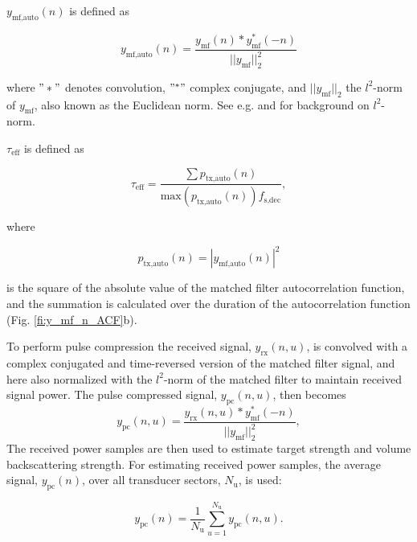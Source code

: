 \documentclass[preprint,12pt,TurnOnLineNumbers]{JASAnew}
\newcommand{\samplesymt}{n}
\newcommand{\channelsym}{u}
\newcommand{\nchannels}{N_{\textrm{u}}}
\newcommand{\fsdec}{f_{\textrm{s,dec}}}
\newcommand{\teff}{\tau_{\textrm{eff}}}
\newcommand{\yrx}{y_{\textrm{rx}}}
\newcommand{\ymf}{y_{\textrm{mf}}}
\newcommand{\ypc}{y_{\textrm{pc}}}
\newcommand{\ymfauto}{y_{\textrm{mf,auto}}}
\newcommand{\ptxauto}{p_{\textrm{tx,auto}}}
\begin{document}
$\ymfauto(\samplesymt)$ is defined as

\begin{equation}
\label{eq:TXAuto}
\ymfauto(\samplesymt) = \frac{\ymf(\samplesymt)*\ymf^*(-\samplesymt)}{||\ymf||^2_2}
\end{equation}

where $"*"$ denotes convolution, $"^*"$ complex conjugate, and $||\ymf||_2$ the $l^2$-norm of $\ymf$, also known as the Euclidean norm. See e.g. \citet{PadgettSigProc} and \citet{GhatakR} for background on $l^2$-norm.  

$\teff$ is defined as

\begin{equation}
\label{eq:TauEff}
\teff = \frac{\sum \ptxauto(\samplesymt)}{\textrm{max}(\ptxauto(\samplesymt))\fsdec},
\end{equation}

where

\begin{equation*}
\ptxauto(\samplesymt)  =  |\ymfauto(\samplesymt)|^2
\end{equation*}

is the square of the absolute value of the matched filter autocorrelation function, and the summation is calculated over the duration of the autocorrelation function (Fig. \ref{fi:y_mf_n_ACF}b).

To perform pulse compression the received signal, $\yrx(\samplesymt,\channelsym)$, is convolved with a complex conjugated and time-reversed version of the matched filter signal, and here also normalized with the $l^2$-norm of the matched filter to maintain received signal power. The pulse compressed signal, $\ypc(\samplesymt,\channelsym)$, then becomes
\begin{equation}
\label{eq:PulseComp}
\ypc(\samplesymt,\channelsym) = \frac{\yrx(\samplesymt,\channelsym)*\ymf^*(-\samplesymt)}{||\ymf||^2_2},
\end{equation}
%
The received power samples are then used to estimate target strength and volume backscattering strength. For estimating received power samples, the average signal, $\ypc(\samplesymt)$, over all transducer sectors, $\nchannels$, is used:

\begin{equation}
\label{eq:SumSig}
\ypc(\samplesymt) = \frac{1}{\nchannels} \sum_{\channelsym = 1}^{\nchannels} \ypc(\samplesymt,\channelsym).
\end{equation}
\end{document}
